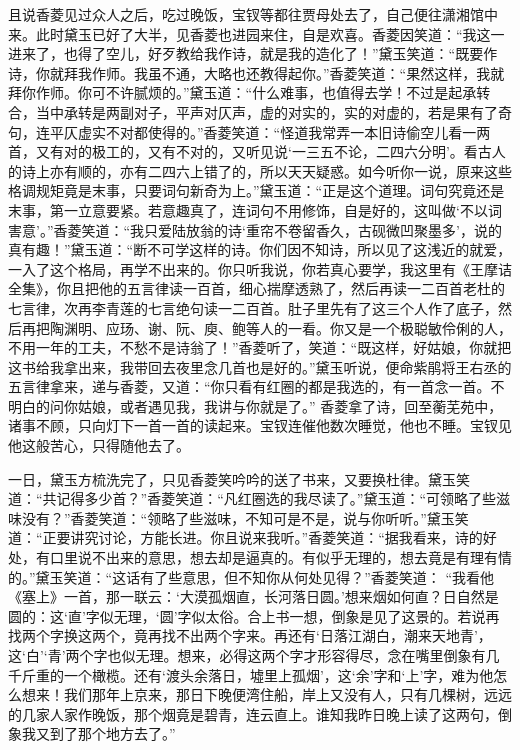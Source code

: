 \begin{parag}


    且说香菱见过众人之后，吃过晚饭，宝钗等都往贾母处去了，自己便往潇湘馆中来。此时黛玉已好了大半，见香菱也进园来住，自是欢喜。香菱因笑道：“我这一进来了，也得了空儿，好歹教给我作诗，就是我的造化了！”黛玉笑道：“既要作诗，你就拜我作师。我虽不通，大略也还教得起你。”香菱笑道：“果然这样，我就拜你作师。你可不许腻烦的。”黛玉道：“什么难事，也值得去学！不过是起承转合，当中承转是两副对子，平声对仄声，虚的对实的，实的对虚的，若是果有了奇句，连平仄虚实不对都使得的。”香菱笑道：“怪道我常弄一本旧诗偷空儿看一两首，又有对的极工的，又有不对的，又听见说‘一三五不论，二四六分明’。看古人的诗上亦有顺的，亦有二四六上错了的，所以天天疑惑。如今听你一说，原来这些格调规矩竟是末事，只要词句新奇为上。”黛玉道：“正是这个道理。词句究竟还是末事，第一立意要紧。若意趣真了，连词句不用修饰，自是好的，这叫做‘不以词害意’。”香菱笑道：“我只爱陆放翁的诗‘重帘不卷留香久，古砚微凹聚墨多’，说的真有趣！”黛玉道：“断不可学这样的诗。你们因不知诗，所以见了这浅近的就爱，一入了这个格局，再学不出来的。你只听我说，你若真心要学，我这里有《王摩诘全集》，你且把他的五言律读一百首，细心揣摩透熟了，然后再读一二百首老杜的七言律，次再李青莲的七言绝句读一二百首。肚子里先有了这三个人作了底子，然后再把陶渊明、应玚、谢、阮、庾、鲍等人的一看。你又是一个极聪敏伶俐的人，不用一年的工夫，不愁不是诗翁了！”香菱听了，笑道：“既这样，好姑娘，你就把这书给我拿出来，我带回去夜里念几首也是好的。”黛玉听说，便命紫鹃将王右丞的五言律拿来，递与香菱，又道：“你只看有红圈的都是我选的，有一首念一首。不明白的问你姑娘，或者遇见我，我讲与你就是了。” 香菱拿了诗，回至蘅芜苑中，诸事不顾，只向灯下一首一首的读起来。宝钗连催他数次睡觉，他也不睡。宝钗见他这般苦心，只得随他去了。
\end{parag}


\begin{parag}


    一日，黛玉方梳洗完了，只见香菱笑吟吟的送了书来，又要换杜律。黛玉笑道：“共记得多少首？”香菱笑道：“凡红圈选的我尽读了。”黛玉道：“可领略了些滋味没有？”香菱笑道：“领略了些滋味，不知可是不是，说与你听听。”黛玉笑道：“正要讲究讨论，方能长进。你且说来我听。”香菱笑道：“据我看来，诗的好处，有口里说不出来的意思，想去却是逼真的。有似乎无理的，想去竟是有理有情的。”黛玉笑道：“这话有了些意思，但不知你从何处见得？”香菱笑道： “我看他《塞上》一首，那一联云：‘大漠孤烟直，长河落日圆。’想来烟如何直？日自然是圆的：这‘直’字似无理，‘圆’字似太俗。合上书一想，倒象是见了这景的。若说再找两个字换这两个，竟再找不出两个字来。再还有‘日落江湖白，潮来天地青’，这‘白’‘青’两个字也似无理。想来，必得这两个字才形容得尽，念在嘴里倒象有几千斤重的一个橄榄。还有‘渡头余落日，墟里上孤烟’，这‘余’字和‘上’字，难为他怎么想来！我们那年上京来，那日下晚便湾住船，岸上又没有人，只有几棵树，远远的几家人家作晚饭，那个烟竟是碧青，连云直上。谁知我昨日晚上读了这两句，倒象我又到了那个地方去了。”
\end{parag}


